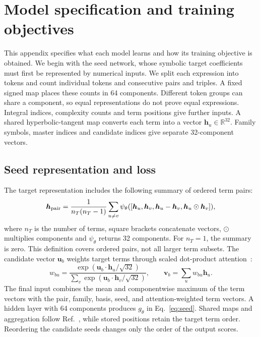 \section{Model specification and training objectives}
\label{app:models}
This appendix specifies what each model learns and how its training objective is obtained. We begin with the seed network, whose symbolic target coefficients must first be represented by numerical inputs. We split each expression into tokens and count individual tokens and consecutive pairs and triples. A fixed signed map places these counts in 64 components. Different token groups can share a component, so equal representations do not prove equal expressions. Integral indices, complexity counts and term positions give further inputs. A shared hyperbolic-tangent map converts each term into a vector $\boldsymbol h_u\in\mathbb R^{32}$. Family symbols, master indices and candidate indices give separate 32-component vectors.

\subsection{Seed representation and loss}
The target representation includes the following summary of ordered term pairs:
\begin{equation}
 \boldsymbol h_{\rm pair}=
 \frac{1}{n_T(n_T-1)}\sum_{u\ne v}
 \psi_\theta([\boldsymbol h_u,\boldsymbol h_v,
       \boldsymbol h_u-\boldsymbol h_v,
       \boldsymbol h_u\odot\boldsymbol h_v]),
 \label{eq:pair}
\end{equation}
where $n_T$ is the number of terms, square brackets concatenate vectors, $\odot$ multiplies components and $\psi_\theta$ returns 32 components. For $n_T=1$, the summary is zero. This definition covers ordered pairs, not all larger term subsets. The candidate vector $\boldsymbol u_b$ weights target terms through scaled dot-product attention~\cite{AttentionIsAllYouNeed}:
\begin{equation}
 w_{bu}=\frac{\exp(\boldsymbol u_b\cdot\boldsymbol h_u/\sqrt{32})}
 {\sum_v\exp(\boldsymbol u_b\cdot\boldsymbol h_v/\sqrt{32})},
 \qquad \boldsymbol v_b=\sum_u w_{bu}\boldsymbol h_u.
\end{equation}
The final input combines the mean and componentwise maximum of the term vectors with the pair, family, basis, seed, and attention-weighted term vectors. A hidden layer with 64 components produces $g_\theta$ in Eq.~\eqref{eq:seed}. Shared maps and aggregation follow Ref.~\cite{DeepSets}, while stored positions retain the target term order. Reordering the candidate seeds changes only the order of the output scores.

